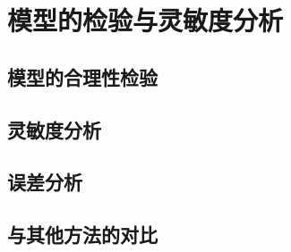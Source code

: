 \section{模型的检验与灵敏度分析}


\subsection{模型的合理性检验}


\subsection{灵敏度分析}


\subsection{误差分析}


\subsection{与其他方法的对比}

